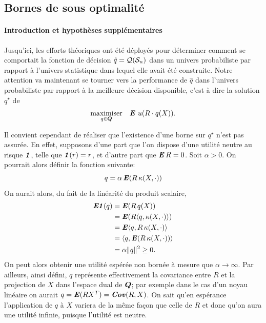 \subsection{Bornes de sous optimalité}
\label{b:sopt}


\paragraph{Introduction et hypothèses supplémentaires}

Jusqu'ici, les efforts théoriques ont été déployés pour déterminer comment se comportait
la fonction de décision $\hat q = \alg(\S_n)$ dans un univers probabiliste par rapport à
l'univers statistique dans lequel elle avait été construite. Notre attention va maintenant
se tourner vers la performance de $\hat q$ dans l'univers probabiliste par rapport à la
meilleure décision disponible, c'est à dire la solution $q^\star$ de 
\begin{equation}
  \maximizeEquation[q \in \Q]{\E\,u(R \cdot q(X)).}
\end{equation}

Il convient cependant de réaliser que l'existence d'une borne sur $q^\star$ n'est pas
assurée. En effet, supposons d'une part que l'on dispose d'une utilité neutre au risque
$\rn$, telle que $\rn(r) = r$, et d'autre part que $\E R=0$. Soit $\alpha>0$. On pourrait alors
définir la fonction suivante:
\begin{equation}
  q = \alpha\E(R\,\kappa(X,\cdot))
\end{equation}
On aurait alors, du fait de la linéarité du produit scalaire,
\begin{align}
  \EN(q) &= \E(R\,q(X))\\
         & =\E(R\inp{q,\kappa(X,\cdot)})\\
         & =\E\inp{q,R\,\kappa(X,\cdot)}\\
         & =\inp{q,\E(R\,\kappa(X,\cdot))}\\
         &= \alpha\nq{q}^2 \geq 0.
\end{align}
On peut alors obtenir une utilité espérée non bornée à mesure que $\alpha\to\infty$. Par ailleurs,
ainsi défini, $q$ représente effectivement la covariance entre $R$ et la projection de $X$
dans l'espace dual de $\Q$; par exemple dans le cas d'un noyau linéaire on aurait
$q = \E(RX^T) = \Cov(R,X)$. On sait qu'en espérance l'application de $q$ à $X$ variera de
la même façon que celle de $R$ et donc qu'on aura une utilité infinie, puisque l'utilité
est neutre.

